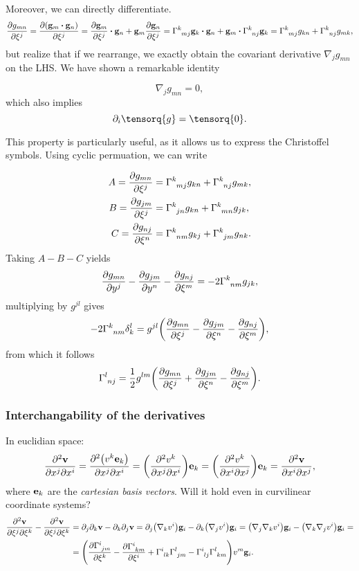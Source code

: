 \documentclass[../main.tex]{subfiles}
\begin{document}
Moreover, we can directly differentiate.
\[
	\pdv{g_{mn}}{\xi^j}=\pdv{\qty(\vb{g}_m \vdot \vb{g}_n)}{\xi^j} = \pdv{\vb{g}_m}{\xi^j} \vdot \vb{g}_n + \vb{g}_m \pdv{\vb{g}_n}{\xi^j}=\Gamma \indices{^k_{mj}}\vb{g}_k \vdot \vb{g}_n + \vb{g}_m \vdot \Gamma \indices{^k_{nj}}\vb{g}_k = \Gamma \indices{^k_{mj}}g_{kn} + \Gamma \indices{^k_{nj}}g_{mk},
\]
but realize that if we rearrange, we exactly obtain the covariant derivative $\nabla_j g_{mn}$ on the LHS. We have shown a remarkable identity

\begin{equation}
    \nabla_j g_{mn} = 0,
\end{equation}
which also implies 
\begin{equation}
  \partial_{i} \tensorq{g} = \tensorq{0}.
\end{equation}

This property is particularly useful, as it allows us to express the Christoffel symbols. Using cyclic permuation, we can write

\begin{align*}
A=	\pdv{g_{mn}}{\xi^j} &= \Gamma \indices{^k_{mj}}g_{kn} + \Gamma \indices{^k_{nj}}g_{mk}, \\
B=	\pdv{g_{jm}}{\xi^j} &= \Gamma \indices{^k_{jn}} g_{kn} + \Gamma \indices{^k_{mn}}g_{jk}, \\
C=	\pdv{g_{nj}}{\xi^n} &= \Gamma \indices{^k_{nm}}g_{kj} + \Gamma \indices{^k_{jm}} g_{nk}.
\end{align*}
Taking $A-B-C$ yields
\[
	\pdv{g_{mn}}{y^j}-\pdv{g_{jm}}{y^n}-\pdv{g_{nj}}{\xi^m} = -2 \Gamma \indices{^k_{nm}}g_{jk},
\]
multiplying by $g^{jl}$ gives
\[
	-2 \Gamma \indices{^k_{nm}}\delta^l_k = g^{jl}\qty(\pdv{g_{mn}}{\xi^j}-\pdv{g_{jm}}{\xi^n}-\pdv{g_{nj}}{\xi^m}),
\]
from which it follows
\begin{equation}
	\label{eq:christoffel}
	\Gamma \indices{^l_{nj}} = \frac{1}{2}g^{lm}\qty(\pdv{g_{mn}}{\xi^j}+\pdv{g_{jm}}{\xi^n}-\pdv{g_{nj}}{\xi^m}).
\end{equation}


\subsubsection{Interchangability of the derivatives}
\label{sec:interchangability}
In euclidian space:
\[
	\pdv[2]{\vb{v}}{x^j}{x^i} = \pdv[2]{\qty(v^k \vb{e}_k)}{x^j}{x^i}= \qty(\pdv[2]{v^k}{x^j}{x^i}) \vb{e}_k = \qty(\pdv[2]{v^k}{x^i}{x^j})\vb{e}_k = \pdv[2]{\vb{v}}{x^i}{x^j},
\]
where $\vb{e}_k$ are the \textit{cartesian basis vectors}. Will it hold even in curvilinear coordinate systems?
\begin{align*}
	\pdv[2]{\vb{v}}{\xi^j}{\xi^k} - \pdv[2]{\vb{v}}{\xi^j}{\xi^k} &= \partial_{j} \partial_{k}\vb{v} - \partial_{k} \partial_{j} \vb{v}=  \partial_{j} \qty(\nabla_k v^i)\vb{g}_i - \partial_{k}\qty(\nabla_j v^i)\vb{g}_i = \qty(\nabla_j \nabla_k v^i) \vb{g}_i - \qty(\nabla_k \nabla_j v^i)\vb{g}_i =\\
								    &= \qty(\pdv{\Gamma \indices{^i_{jm}}}{\xi^k} - \pdv{\Gamma \indices{^i_{km}}}{\xi^i} + \Gamma \indices{^i_{lk}} \Gamma \indices{^l_{jm}}- \Gamma \indices{^i_{lj}} \Gamma \indices{^l_{km}})v^m \vb{g}_i.
\end{align*}
\end{document}
